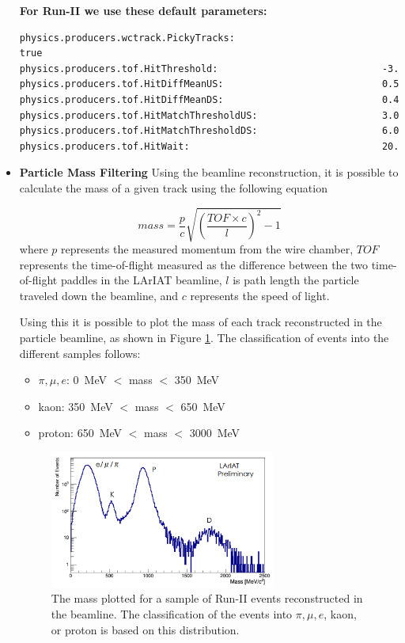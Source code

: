 \begin{itemize}
\textbf{For Run-II we use these default parameters:}
\begin{verbatim} 
physics.producers.wctrack.PickyTracks:                          true
physics.producers.tof.HitThreshold:                             -3.
physics.producers.tof.HitDiffMeanUS:                            0.5  
physics.producers.tof.HitDiffMeanDS:                            0.4  
physics.producers.tof.HitMatchThresholdUS:                      3.0  
physics.producers.tof.HitMatchThresholdDS:                      6.0  
physics.producers.tof.HitWait:                                  20.
\end{verbatim}

\item \textbf{Particle Mass Filtering}
Using the beamline reconstruction, it is possible to calculate the mass of a given track using the following equation

\begin{equation}
mass = \frac{p}{c}\sqrt{(\frac{TOF \times c}{l})^2 -1}
\end{equation}
where $p$ represents the measured momentum from the wire chamber, $TOF$ represents the time-of-flight measured as the difference between the two time-of-flight paddles in the LArIAT beamline, $l$ is path length the particle traveled down the beamline, and $c$ represents the speed of light.

Using this it is possible to plot the mass of each track reconstructed in the particle beamline, as shown in Figure \ref{fig:mass}. The classification of events into the different samples follows:

\begin{itemize}

\item $\pi, \mu, e$: 0~MeV $<$ mass $<$ 350~MeV

\item kaon: 350~MeV $<$ mass $<$ 650~MeV

\item proton: 650~MeV $<$ mass $<$ 3000~MeV

\end{itemize}

\begin{figure}[htb]
\centering
\includegraphics[width=0.70\textwidth]{images/mass.png}
\caption{The mass plotted for a sample of Run-II events reconstructed in the beamline. The classification of the events into $\pi, \mu, e$, kaon, or proton is based on this distribution.}
\label{fig:mass}
\end{figure}


\end{itemize}
